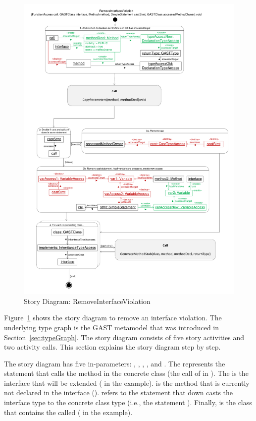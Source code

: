 \begin{figure}[hbtp]
\centering
\includegraphics[width=\linewidth]{./figures/SDRemoveInterfaceViolation}
\caption{Story Diagram: RemoveInterfaceViolation}
\label{fig:SDRemoveInterfaceViolation}
\end{figure}

Figure~\ref{fig:SDRemoveInterfaceViolation} shows the story diagram to remove an interface violation. The underlying type graph is the GAST metamodel that was introduced in Section~\ref{sec:typeGraph}. The story diagram consists of five story activities and two activity calls. This section explains the story diagram step by step.

The story diagram has five in-parameters: , , , , and . The  represents the statement that calls the method in the concrete class (the call of  in ). The  is the interface that will be extended ( in the example).  is the method that is currently not declared in the interface ().  refers to the statement that down casts the interface type to the concrete class type (i.e., the statement ). Finally,  is the class that contains the called  ( in the example).

